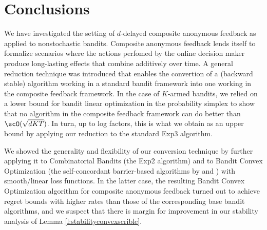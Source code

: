 
\section{Conclusions}
%
We have investigated the setting of $d$-delayed composite anonymous feedback as applied to nonstochastic bandits. Composite anonymous feedback lends itself to formalize scenarios where the actions perfomed by the online decision maker produce long-lasting effects that combine additively over time. A general reduction technique was introduced that enables the convertion of a (backward stable) algorithm working in a standard bandit framework into one working in the composite feedback framework. 
In the case of $K$-armed bandits, we relied on a lower bound for bandit linear optimization in the probability simplex to show that no algorithm in the composite feedback framework can do better than $\scO(\sqrt{dKT})$. In turn, up to log factors, this is what we obtain as an upper bound by applying our reduction to the standard Exp3 algorithm.

We showed the generality and flexibility of our conversion technique by further applying it to Combinatorial Bandits (the Exp2 algorithm) and to Bandit Convex Optimization (the self-concordant barrier-based algorithms by \cite{ahr12} and \cite{st11}) with smooth/linear loss functions. In the latter case, the resulting Bandit Convex Optimization algorithm for composite anonymous feedback turned out to achieve regret bounds with higher rates than those of the corresponding base bandit algorithms, and we suspect that there is margin for improvement in our stability analysis of Lemma \ref{l:stabilityconvexscrible}.


\iffalse
************************
We then extended our results to the Bandit Convex Optimization framework, thereby showing the generality and flexibility of our conversion technique. As an example, we applied 

We Our reduction is flexible

 that works under the assumption of an oblivious adversary generating loss components. 

provided a general reduction that does such and such

in the case of k armed upper and lower bound, matching up to log factors. lower bound reduces to bandit linear optimization




flexibility, extension to combinatorial and bco, an example of application with beta smooth and self-concordant barriers.

Our analysis of bco is almost certainly suboptimal,
************************
\fi


